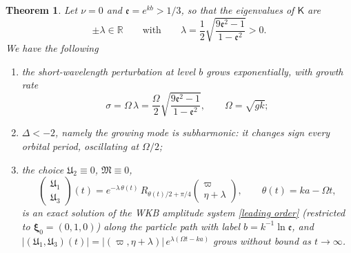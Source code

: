 \documentclass[10pt,a4paper]{amsart}
\newcommand{\B}{{\mathfrak{M}}}
\newcommand{\ee}{\mathfrak{e}}
\newtheorem{theorem}{Theorem}
\begin{document}
\begin{theorem}\label{thm:neutral}
Let $\nu=0$ and $\ee=e^{kb}>1/3$, so that the eigenvalues of $\mathsf K$ are 
\begin{equation}
    \pm\lambda\in \mathbb{R} \qquad\text{with}\qquad\lambda=\frac{1}{2} \sqrt{\frac{9\ee^2-1}{1-\ee^2}}>0.
\end{equation}
We have the following
\begin{enumerate}
    \item[(i)] the short-wavelength perturbation at level $b$ grows exponentially, with growth rate
\begin{equation}\label{eq:sigma0}
\sigma=\Omega\,\lambda=\frac{\Omega}{2}\sqrt{\frac{9\ee^2-1}{1-\ee^2}},\qquad \Omega=\sqrt{gk};\end{equation}
\item[(ii)] $\Delta<-2$, namely the growing mode is subharmonic: it changes sign every orbital period, oscillating at $\Omega/2$;
\item[(iii)] the choice $\mathfrak{U}_2\equiv0$, $\B\equiv0$,
\begin{equation}\label{eq:explicit}
\begin{pmatrix}\mathfrak{U}_1\\\mathfrak{U}_3\end{pmatrix}(t)
=e^{-\lambda\,\theta(t)}\,R_{\theta(t)/2+\pi/4}\begin{pmatrix}\varpi\\\eta+\lambda\end{pmatrix},
\qquad \theta(t)=ka-\Omega t,
\end{equation}
is an exact solution of the WKB amplitude system \eqref{leading order} (restricted to $\boldsymbol\xi_0=(0,1,0)$) along the particle path with label $b=k^{-1}\ln\ee$, and $|(\mathfrak{U}_1,\mathfrak{U}_3)(t)|=|(\varpi,\eta+\lambda)|\,e^{\lambda(\Omega t-ka)}$ grows without bound as $t\to\infty$. 
\end{enumerate}
\end{theorem}
\end{document}
